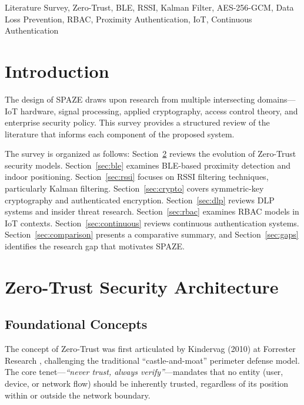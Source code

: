 \documentclass[conference]{IEEEtran}
\begin{document}
\begin{IEEEkeywords}
Literature Survey, Zero-Trust, BLE, RSSI, Kalman Filter, AES-256-GCM, Data Loss Prevention, RBAC, Proximity Authentication, IoT, Continuous Authentication
\end{IEEEkeywords}

\section{Introduction}

The design of SPAZE draws upon research from multiple intersecting domains—IoT hardware, signal processing, applied cryptography, access control theory, and enterprise security policy. This survey provides a structured review of the literature that informs each component of the proposed system.

The survey is organized as follows: Section~\ref{sec:zerotrust} reviews the evolution of Zero-Trust security models. Section~\ref{sec:ble} examines BLE-based proximity detection and indoor positioning. Section~\ref{sec:rssi} focuses on RSSI filtering techniques, particularly Kalman filtering. Section~\ref{sec:crypto} covers symmetric-key cryptography and authenticated encryption. Section~\ref{sec:dlp} reviews DLP systems and insider threat research. Section~\ref{sec:rbac} examines RBAC models in IoT contexts. Section~\ref{sec:continuous} reviews continuous authentication systems. Section~\ref{sec:comparison} presents a comparative summary, and Section~\ref{sec:gaps} identifies the research gap that motivates SPAZE.

\section{Zero-Trust Security Architecture}
\label{sec:zerotrust}

\subsection{Foundational Concepts}
The concept of Zero-Trust was first articulated by Kindervag (2010) at Forrester Research \cite{kindervag2010}, challenging the traditional ``castle-and-moat'' perimeter defense model. The core tenet—\textit{``never trust, always verify''}—mandates that no entity (user, device, or network flow) should be inherently trusted, regardless of its position within or outside the network boundary.
\end{document}

